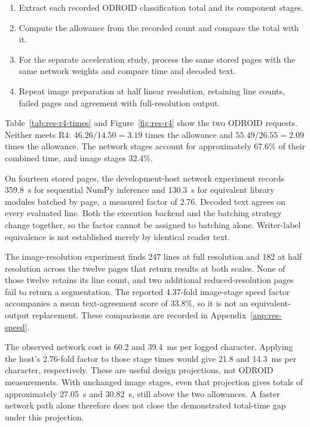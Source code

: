 \begin{enumerate}\setlength{\itemsep}{1pt}
\item Extract each recorded ODROID classification total and its component stages.
\item Compute the allowance from the recorded count and compare the total with it.
\item For the separate acceleration study, process the same stored pages with the same network weights and compare time and decoded text.
\item Repeat image preparation at half linear resolution, retaining line counts, failed pages and agreement with full-resolution output.
\end{enumerate}

Table~\ref{tab:res-r4-times} and Figure~\ref{fig:res-r4} show the two ODROID requests. Neither meets R4: $46.26/14.50=3.19$ times the allowance and $55.49/26.55=2.09$ times the allowance. The network stages account for approximately 67.6\% of their combined time, and image stages 32.4\%.


On fourteen stored pages, the development-host network experiment records 359.8~s for sequential NumPy inference and 130.3~s for equivalent library modules batched by page, a measured factor of 2.76. Decoded text agrees on every evaluated line. Both the execution backend and the batching strategy change together, so the factor cannot be assigned to batching alone. Writer-label equivalence is not established merely by identical reader text.

The image-resolution experiment finds 247 lines at full resolution and 182 at half resolution across the twelve pages that return results at both scales. None of those twelve retains its line count, and two additional reduced-resolution pages fail to return a segmentation. The reported 4.37-fold image-stage speed factor accompanies a mean text-agreement score of 33.8\%, so it is not an equivalent-output replacement. These comparisons are recorded in Appendix~\ref{app:res-speed}.

The observed network cost is 60.2 and 39.4~ms per logged character. Applying the host's 2.76-fold factor to those stage times would give 21.8 and 14.3~ms per character, respectively. These are useful design projections, not ODROID measurements. With unchanged image stages, even that projection gives totals of approximately 27.05~s and 30.82~s, still above the two allowances. A faster network path alone therefore does not close the demonstrated total-time gap under this projection.

